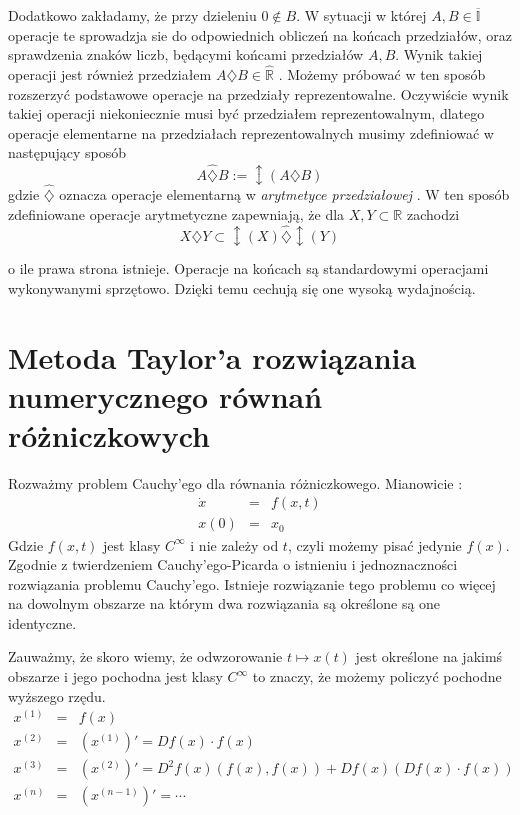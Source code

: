  Dodatkowo zakładamy, że przy dzieleniu $0 \notin B $. W sytuacji w której $ A,B \in \overline{ \mathbb I } $ operacje te sprowadzja 
 sie do odpowiednich obliczeń na końcach przedziałów, oraz sprawdzenia znaków liczb, będącymi końcami przedziałów $ A,B $.
 Wynik takiej operacji jest również przedziałem $ A \diamondsuit B \in \hat {\mathbb R } $ .
 Możemy próbować w ten sposób rozszerzyć podstawowe operacje na przedziały reprezentowalne. Oczywiście wynik takiej operacji
 niekoniecznie musi być przedziałem reprezentowalnym, dlatego operacje elementarne na przedziałach reprezentowalnych musimy zdefiniować w
 następujący sposób 
 \begin{equation}
    A \hat{\diamondsuit} B := \updownarrow (A \diamondsuit B ) 
 \end{equation}
 gdzie $ \hat { \diamondsuit } $ oznacza operacje elementarną w {\em arytmetyce przedziałowej }. 
 W ten sposób zdefiniowane operacje arytmetyczne zapewniają, że dla $ X,Y \subset \mathbb R $ zachodzi
 \begin{equation}
    X \diamondsuit Y \subset \updownarrow(X) \hat{\diamondsuit} \updownarrow(Y)
 \end{equation}
 
 o ile prawa strona istnieje. 
 Operacje na końcach są standardowymi operacjami wykonywanymi sprzętowo. Dzięki temu cechują się one 
 wysoką wydajnością. 
 
 \section{Metoda Taylor'a rozwiązania numerycznego równań różniczkowych}
 Rozważmy problem Cauchy'ego dla równania różniczkowego. Mianowicie :
 \begin{eqnarray*}
    \dot x & = & f(x,t) \\
    x(0) & = & x_0
 \end{eqnarray*}
 Gdzie $ f(x,t) $ jest klasy $ C^{ \infty } $ i nie zależy od $ t $, czyli możemy pisać jedynie $ f(x) $.
 Zgodnie z twierdzeniem Cauchy'ego-Picarda o istnieniu i jednoznaczności rozwiązania problemu Cauchy'ego. Istnieje rozwiązanie tego problemu co więcej
 na dowolnym obszarze na którym dwa rozwiązania są określone są one identyczne.
 
 Zauważmy, że skoro wiemy, że odwzorowanie $ t \mapsto x(t) $ jest określone na jakimś obszarze i jego pochodna jest klasy $ C^{ \infty } $ to znaczy,
 że możemy policzyć pochodne wyższego rzędu.
\begin{eqnarray*}
    x^{(1)} & = & f(x) \\
    x^{(2)} & = & (x^{(1)})' = Df(x) \cdot f(x) \\
    x^{(3)} & = & (x^{(2)})' = D^2f(x) (f(x),f(x)) + Df(x)(Df(x) \cdot f(x)) \\
    x^{(n)} & = & (x^{(n-1)})' = \cdots
\end{eqnarray*}


